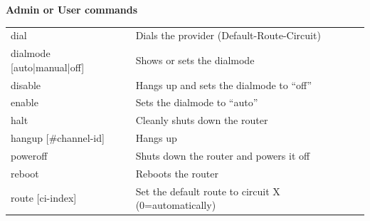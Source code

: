   \begin{table}
    \textbf{Admin or User commands}

    \vspace{1ex}
    \begin{tabular}{lp{9cm}}

      dial                      &    Dials the provider
                                     (Default-Route-Circuit) \\
      dialmode [auto|manual|off]&    Shows or sets the dialmode \\
      disable                   &    Hangs up and sets the dialmode to
                                     ``off'' \\
      enable                    &    Sets the dialmode to ``auto'' \\
      halt                      &    Cleanly shuts down the router \\
      hangup [\#channel-id]     &    Hangs up \\
      poweroff                  &    Shuts down the router and powers it off \\
      reboot                    &    Reboots the router \\
      route [ci-index]          &    Set the default route to circuit X
                                     (0=automatically) \\
    \end{tabular}
  \end{table}


